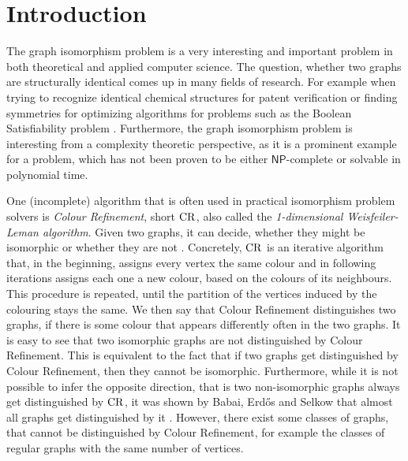 \section{Introduction}

The graph isomorphism problem is a very interesting and important problem in both theoretical and applied computer science.
The question, whether two graphs are structurally identical comes up in many fields of research.
For example when trying to recognize identical chemical structures for patent verification \cite{ray1957FindingChemical} or finding symmetries for optimizing algorithms for problems such as the Boolean Satisfiability problem \cite{grohe2020GraphIsomorphism}.
Furthermore, the graph isomorphism problem is interesting from a complexity theoretic perspective, as it is a prominent example for a problem, which has not been proven to be either $\mathsf{NP}$-complete or solvable in polynomial time. \cite{babai2016GraphIsomorphism}

One (incomplete) algorithm that is often used in practical isomorphism problem solvers \cite{grohe2020GraphIsomorphism} is \emph{Colour Refinement}, short $\operatorname{CR}$, also called the \emph{1-dimensional Weisfeiler-Leman algorithm}.
Given two graphs, it can decide, whether they might be isomorphic or whether they are not \cite{berkholz2017TightLowera}.
Concretely, $\operatorname{CR}$ is an iterative algorithm that, in the beginning, assigns every vertex the same colour and in following iterations assigns each one a new colour, based on the colours of its neighbours.
This procedure is repeated, until the partition of the vertices induced by the colouring stays the same. 
We then say that Colour Refinement distinguishes two graphs, if there is some colour that appears differently often in the two graphs.
It is easy to see that two isomorphic graphs are not distinguished by Colour Refinement.
This is equivalent to the fact that if two graphs get distinguished by Colour Refinement, then they cannot be isomorphic.
Furthermore, while it is not possible to infer the opposite direction, that is two non-isomorphic graphs always get distinguished by $\operatorname{CR}$, it was shown by Babai, Erd\H{o}s and Selkow that almost all graphs get distinguished by it \cite{babai1980RandomGraph}.
However, there exist some classes of graphs, that cannot be distinguished by Colour Refinement, for example the classes of regular graphs with the same number of vertices.

